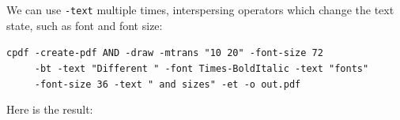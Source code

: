 \documentclass{book}
\begin{document}
\noindent We can use \texttt{-text} multiple times, interspersing operators which change the text state, such as font and font size:

\begin{framed}
 \noindent\small\verb?cpdf -create-pdf AND -draw -mtrans "10 20" -font-size 72?\\
 \noindent\small\verb?     -bt -text "Different " -font Times-BoldItalic -text "fonts"?\\
 \noindent\small\verb?     -font-size 36 -text " and sizes" -et -o out.pdf?
\end{framed}

\noindent Here is the result:

\bigskip
\ifdefined\HCode
{}
\else
{}
\fi
\bigskip
\end{document}

